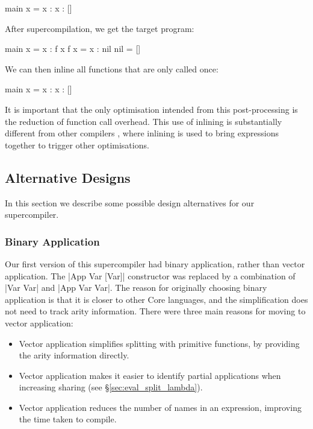 \documentclass[draft]{sigplanconf}
\begin{document}
\begin{code}
main x = x : x : []
\end{code}

\noindent After supercompilation, we get the target program:

\begin{code}
main x = x : f x
f x = x : nil
nil = []
\end{code}

\noindent We can then inline all functions that are only called once:

\begin{code}
main x = x : x : []
\end{code}

It is important that the only optimisation intended from this post-processing is the reduction of function call overhead. This use of inlining is substantially different from other compilers \cite{spj:inlining}, where inlining is used to bring expressions together to trigger other optimisations.

\subsection{Alternative Designs}
\label{sec:extensions}

In this section we describe some possible design alternatives for our supercompiler.

\subsubsection{Binary Application}
\label{sec:binaryapp}

Our first version of this supercompiler had binary application, rather than vector application. The |App Var [Var]| constructor was replaced by a combination of |Var Var| and |App Var Var|. The reason for originally choosing binary application is that it is closer to other Core languages, and the simplification does not need to track arity information. There were three main reasons for moving to vector application:

\begin{itemize}
\item Vector application simplifies splitting with primitive functions, by providing the arity information directly.
\item Vector application makes it easier to identify partial applications when increasing sharing (see \S\ref{sec:eval_split_lambda}).
\item Vector application reduces the number of names in an expression, improving the time taken to compile.
\end{itemize}
\end{document}
